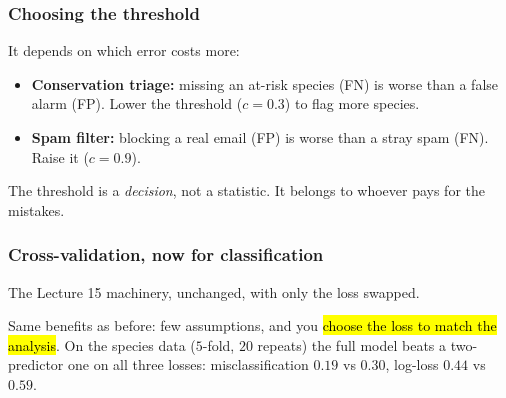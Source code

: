 \documentclass[slidestop,compress,mathserif]{beamer}
\begin{document}
\begin{frame}
\frametitle{Choosing the threshold}


\pause
\vspace{0.3em}
It depends on which error costs more:
\begin{itemize}
\item \textbf{Conservation triage:} missing an at-risk species (FN) is worse than a false alarm (FP). Lower the threshold ($c = 0.3$) to flag more species.
\pause
\item \textbf{Spam filter:} blocking a real email (FP) is worse than a stray spam (FN). Raise it ($c = 0.9$).
\end{itemize}

\pause
\vspace{0.3em}
{\small The threshold is a \emph{decision}, not a statistic. It belongs to whoever pays for the mistakes.}

\end{frame}


\begin{frame}
\frametitle{Cross-validation, now for classification}

The Lecture 15 machinery, unchanged, with only the loss swapped.

\pause
\vspace{0.3em}

\pause
\vspace{0.3em}
{\small Same benefits as before: few assumptions, and you \hl{choose the loss to match the analysis}. On the species data ($5$-fold, $20$ repeats) the full model beats a two-predictor one on all three losses: misclassification $0.19$ vs $0.30$, log-loss $0.44$ vs $0.59$.}

\end{frame}
\end{document}
